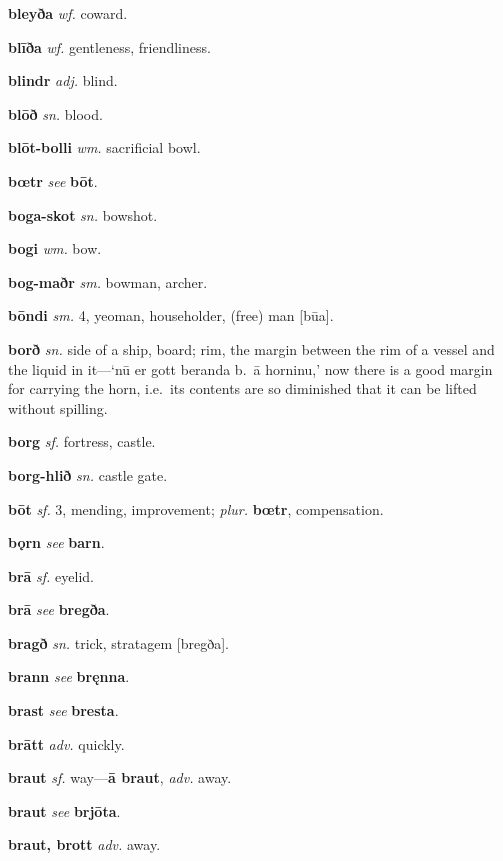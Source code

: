 \documentclass[12pt,letterpaper]{book}
\begin{document}
\noindent
\textbf{bleyða} \textit{wf.} coward.

\noindent
\textbf{blīða} \textit{wf.} gentleness, friendliness.

\noindent
\textbf{blindr} \textit{adj.} blind.

\noindent
\textbf{blōð} \textit{sn.} blood.

\noindent
\textbf{blōt-bolli} \textit{wm.} sacrificial bowl.

\noindent
\textbf{bœtr} \textit{} \textit{see} \textbf{bōt}.

\noindent
\textbf{boga-skot} \textit{sn.} bowshot.

\noindent
\textbf{bogi} \textit{wm.} bow.

\noindent
\textbf{bog-maðr} \textit{sm.} bowman, archer.

\noindent
\textbf{bōndi} \textit{sm.} 4, yeoman, householder, (free) man [būa].

\noindent
\textbf{borð} \textit{sn.} side of a ship, board; rim, the margin between
	the rim of a vessel and the liquid in it---`nū er gott beranda
    b.\ ā horninu,' now there is a good margin for carrying the
    horn, i.e.\ its contents are so diminished that it can be
    lifted without spilling.

\noindent
\textbf{borg} \textit{sf.} fortress, castle.

\noindent
\textbf{borg-hlið} \textit{sn.} castle gate.

\noindent
\textbf{bōt} \textit{sf.} 3, mending, improvement; \textit{plur.} \textbf{bœtr},
	compensation.

\noindent
\textbf{bǫrn} \textit{} \textit{see} \textbf{barn}.

\noindent
\textbf{brā} \textit{sf.} eyelid.

\noindent
\textbf{brā} \textit{} \textit{see} \textbf{bregða}.

\noindent
\textbf{bragð} \textit{sn.} trick, stratagem [bregða].

\noindent
\textbf{brann} \textit{} \textit{see} \textbf{bręnna}.

\noindent
\textbf{brast} \textit{} \textit{see} \textbf{bresta}.

\noindent
\textbf{brātt} \textit{adv.} quickly.

\noindent
\textbf{braut} \textit{sf.} way---\textbf{ā braut}, \textit{adv.} away.

\noindent
\textbf{braut} \textit{} \textit{see} \textbf{brjōta}.

\noindent
\textbf{braut, brott} \textit{adv.} away.
\end{document}
